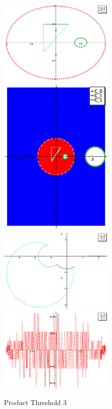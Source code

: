 \documentclass[a4paper,10pt]{article}
\begin{document}
\graphicspath{{./GE2LE1PT3/}}
\begin{figure}[!ht]
\caption{Product Threshold 3}
\includegraphics[width=0.5\textwidth]{circle_plot.eps}
\includegraphics[width=0.5\textwidth]{Fundamental_domain.eps}
\includegraphics[width=0.5\textwidth]{zedplot.eps}
\includegraphics[width=0.5\textwidth]{zedplot_C0.eps}
\end{figure}
\end{document}
